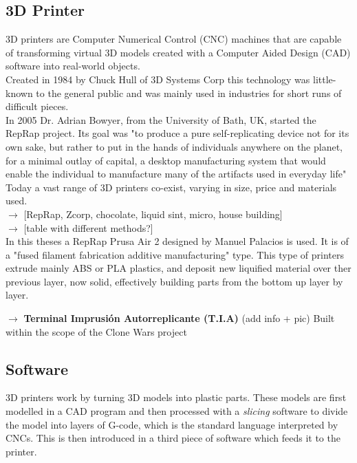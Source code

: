\subsection{3D Printer}

3D printers are Computer Numerical Control (CNC) machines that are capable of transforming virtual 3D models created with a Computer Aided Design (CAD) software into real-world objects.\\

Created in 1984 by Chuck Hull of 3D Systems Corp this technology was little-known to the general public and was mainly used in industries for short runs of difficult pieces.\\
In 2005 Dr. Adrian Bowyer, from the University of Bath, UK, started the RepRap project. Its goal was "to produce a pure self-replicating device not for its own sake, but rather to put in the hands of individuals anywhere on the planet, for a minimal outlay of capital, a desktop manufacturing system that would enable the individual to manufacture many of the artifacts used in everyday life" \\

Today a vast range of 3D printers co-exist, varying in size, price and materials used. \\


$\rightarrow$ [RepRap, Zcorp, chocolate, liquid sint, micro, house building]\\

$\rightarrow$ [table with different methods?]\\

In this theses a RepRap Prusa Air 2 designed by Manuel Palacios is used. It is of a "fused filament fabrication additive manufacturing" type. This type of printers extrude mainly ABS or PLA plastics, and deposit new liquified material over ther previous layer, now solid, effectively building parts from the bottom up layer by layer.

$\rightarrow$ \textbf {Terminal Imprusión Autorreplicante (T.I.A) }
(add info + pic)
Built within the scope of the Clone Wars project



\subsection{Software}
3D printers work by turning 3D models into plastic parts. These models are first modelled in a CAD program and then processed with a \textit{slicing} software to divide the model into layers of G-code, which is the standard language interpreted by CNCs. This is then introduced in a third piece of software which feeds it to the printer.

